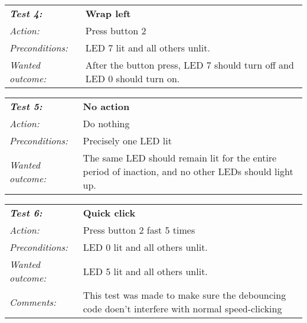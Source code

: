 \begin{tabular}[h]{lp{12cm}} \hline
\textbf{\emph{Test 4:}} 		& \textbf{Wrap left}\\
\emph{Action:} 		& Press button 2\\
\emph{Preconditions:}	& LED 7 lit and all others unlit.\\
\emph{Wanted outcome:}	& After the button press, LED 7 should turn off and LED 0 should turn on.\\ \hline
\end{tabular}

\begin{tabular}[h]{lp{12cm}} \hline
\textbf{\emph{Test 5:}} 		& \textbf{No action}\\
\emph{Action:} 		& Do nothing\\
\emph{Preconditions:}	& Precisely one LED lit\\
\emph{Wanted outcome:}	& The same LED should remain lit for the entire period of inaction, and no other LEDs should light up.\\ \hline
\end{tabular}

\begin{tabular}[h]{lp{12cm}} \hline
\textbf{\emph{Test 6:}} 		& \textbf{Quick click}\\
\emph{Action:} 		& Press button 2 fast 5 times\\
\emph{Preconditions:}	& LED 0 lit and all others unlit.\\
\emph{Wanted outcome:}	& LED 5 lit and all others unlit.\\
\emph{Comments:}		& This test was made to make sure the debouncing code doen’t interfere with normal speed-clicking \\ \hline
\end{tabular}


